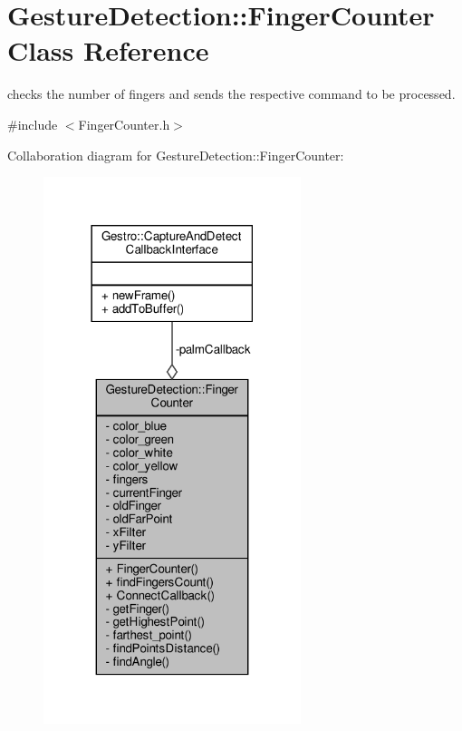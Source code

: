 \hypertarget{class_gesture_detection_1_1_finger_counter}{}\section{Gesture\+Detection\+:\+:Finger\+Counter Class Reference}
\label{class_gesture_detection_1_1_finger_counter}


checks the number of fingers and sends the respective command to be processed.  




{\ttfamily \#include $<$Finger\+Counter.\+h$>$}



Collaboration diagram for Gesture\+Detection\+:\+:Finger\+Counter\+:
\nopagebreak
\begin{figure}[H]
\begin{center}
\leavevmode
\includegraphics[width=213pt]{class_gesture_detection_1_1_finger_counter__coll__graph}
\end{center}
\end{figure}

